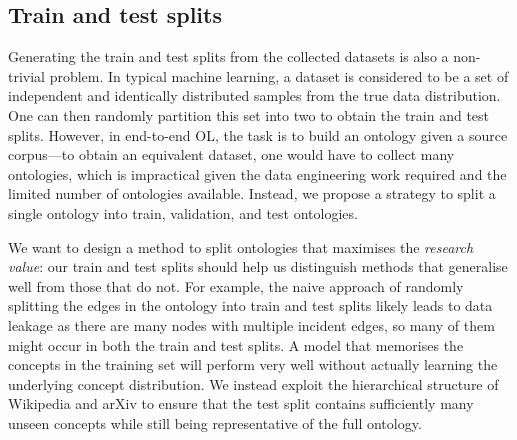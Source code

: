\subsection{Train and test splits}  \label{sec:implementation:train-test-split}

Generating the train and test splits from the collected datasets is also a non-trivial problem. In typical machine learning, a dataset is considered to be a set of independent and identically distributed samples from the true data distribution. One can then randomly partition this set into two to obtain the train and test splits. However, in end-to-end OL, the task is to build an ontology given a source corpus---to obtain an equivalent dataset, one would have to collect many ontologies, which is impractical given the data engineering work required and the limited number of ontologies available. Instead, we propose a strategy to split a single ontology into train, validation, and test ontologies.



We want to design a method to split ontologies that maximises the \emph{research value}: our train and test splits should help us distinguish methods that generalise well from those that do not. For example, the naive approach of randomly splitting the edges in the ontology into train and test splits likely leads to data leakage as there are many nodes with multiple incident edges, so many of them might occur in both the train and test splits. A model that memorises the concepts in the training set will perform very well without actually learning the underlying concept distribution. We instead exploit the hierarchical structure of Wikipedia and arXiv to ensure that the test split contains sufficiently many unseen concepts while still being representative of the full ontology.

